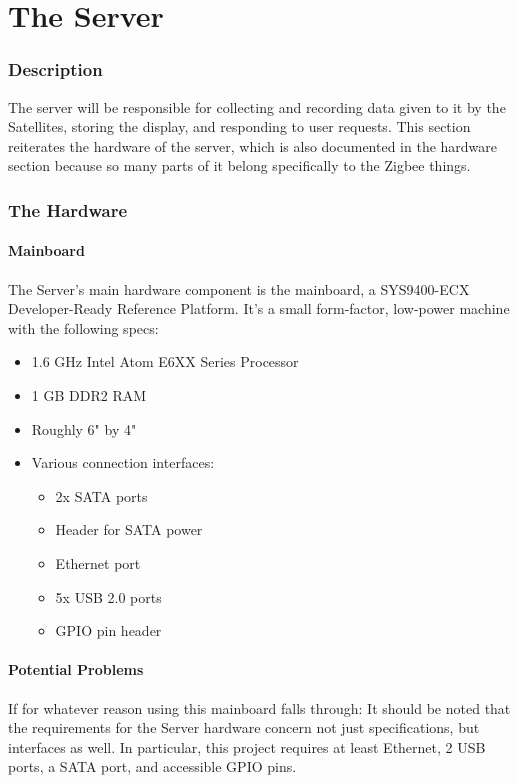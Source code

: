 \chapter{The Server}

\subsection{Description}

The server will be responsible for collecting and recording data given to it by the Satellites, storing the display, and responding to user requests. 
This section reiterates the hardware of the server, which is also documented in the hardware section because so many parts of it belong specifically to the Zigbee things.

\subsection{The Hardware}

\subsubsection{Mainboard}
The Server's main hardware component is the mainboard, a SYS9400-ECX Developer-Ready Reference Platform. 
It's a small form-factor, low-power machine with the following specs:

\begin{itemize}
	\item 1.6 GHz Intel Atom E6XX Series Processor
	\item 1 GB DDR2 RAM
	\item Roughly 6" by 4"
	\item Various connection interfaces:
	\begin{itemize}
		\item 2x \ac{SATA} ports
		\item Header for \ac{SATA} power
		\item Ethernet port
		\item 5x \ac{USB} 2.0 ports
		\item \ac{GPIO} pin header
	\end{itemize}
\end{itemize}

\subsubsection{Potential Problems}
If for whatever reason using this mainboard falls through: 
It should be noted that the requirements for the Server hardware concern not just specifications, but interfaces as well.
In particular, this project requires at least Ethernet, 2 \ac{USB} ports, a \ac{SATA} port, and accessible \ac{GPIO} pins.
